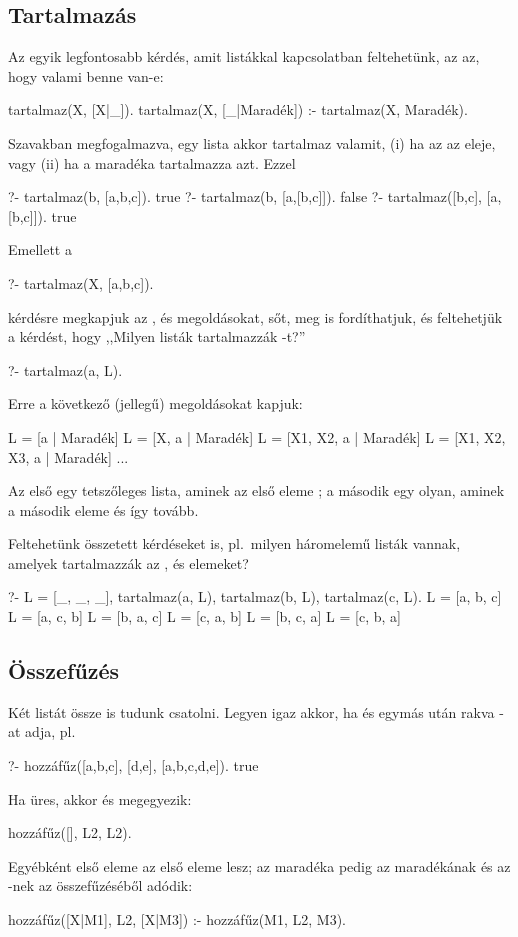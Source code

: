 \subsection*{Tartalmazás}
Az egyik legfontosabb kérdés, amit listákkal
kapcsolatban feltehetünk, az az, hogy valami benne
van-e:
\begin{program}
tartalmaz(X, [X|_]).
tartalmaz(X, [_|Maradék]) :- tartalmaz(X, Maradék).
\end{program}
Szavakban megfogalmazva, egy lista akkor tartalmaz
valamit, (i) ha az az eleje, vagy (ii) ha a maradéka
tartalmazza azt. Ezzel
\begin{query}
?- tartalmaz(b, [a,b,c]).
true
?- tartalmaz(b, [a,[b,c]]).
false
?- tartalmaz([b,c], [a,[b,c]]).
true
\end{query}
Emellett a
\begin{query}
?- tartalmaz(X, [a,b,c]).
\end{query}
kérdésre megkapjuk az ,  és
 megoldásokat, sőt, meg is fordíthatjuk,
és feltehetjük a kérdést, hogy ,,Milyen listák
tartalmazzák -t?''
\begin{query}
?- tartalmaz(a, L).
\end{query}
Erre a következő (jellegű) megoldásokat kapjuk:
\begin{query}
L = [a | Maradék]
L = [X, a | Maradék]
L = [X1, X2, a | Maradék]
L = [X1, X2, X3, a | Maradék]
...
\end{query}
Az első egy tetszőleges lista, aminek az első eleme
; a második egy olyan, aminek a második eleme
 és így tovább.

Feltehetünk összetett kérdéseket is, pl.~milyen
háromelemű listák vannak, amelyek tartalmazzák az
,  és  elemeket?
\begin{query}
?- L = [_, _, _], tartalmaz(a, L),
   tartalmaz(b, L), tartalmaz(c, L).
L = [a, b, c]
L = [a, c, b]
L = [b, a, c]
L = [c, a, b]
L = [b, c, a]
L = [c, b, a]
\end{query}

\subsection*{Összefűzés}
Két listát össze is tudunk csatolni. Legyen
 igaz akkor, ha  és
 egymás után rakva -at adja, pl.
\begin{query}
?- hozzáfűz([a,b,c], [d,e], [a,b,c,d,e]).
true
\end{query}
Ha  üres, akkor  és 
megegyezik:
\begin{program}
hozzáfűz([], L2, L2).
\end{program}
Egyébként  első eleme az  első eleme
lesz; az  maradéka pedig az 
maradékának és az -nek az összefűzéséből
adódik:
\begin{program}
hozzáfűz([X|M1], L2, [X|M3]) :- hozzáfűz(M1, L2, M3).
\end{program}

